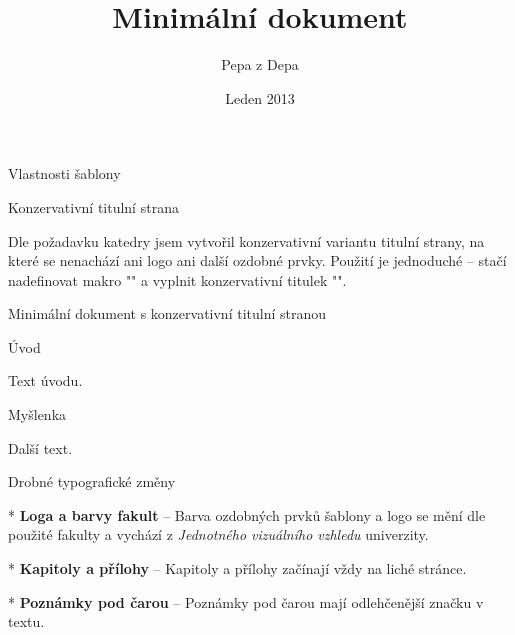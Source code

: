 
\chap Vlastnosti šablony

\sec Konzervativní titulní strana

Dle požadavku katedry jsem vytvořil konzervativní variantu titulní strany, na které se nenachází ani logo ani další ozdobné prvky. Použití je jednoduché -- stačí nadefinovat makro "\def\conservative{}" a vyplnit konzervativní titulek "\conservativetitle{\the\title: \the\subtitle}".


\secc Minimální dokument s konzervativní titulní stranou

\begtt
\def\conservative{}



\worktype [B/CZ]
\title {Minimální dokument}
\conservativetitle{\the\title}
\author {Pepa z Depa}
\date {Leden 2013}
\makefront

\chap Úvod

Text úvodu.

\sec Myšlenka

Další text.
\bye
\endtt

\sec Drobné typografické změny

\begitems

* {\bf Loga a barvy fakult} -- Barva ozdobných prvků šablony a logo se mění dle použité fakulty a vychází z {\sl Jednotného vizuálního vzhledu} univerzity.

* {\bf Kapitoly a přílohy} -- Kapitoly a přílohy začínají vždy na liché stránce.

* {\bf Poznámky pod čarou} -- Poznámky pod čarou mají odlehčenější značku v textu.

\enditems
